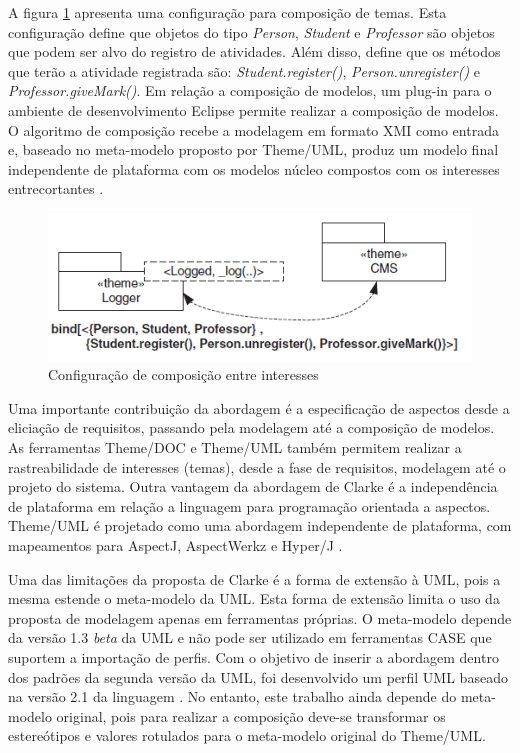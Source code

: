 A figura \ref{fig:theme_3} apresenta uma configuração para composição de temas. Esta configuração define que objetos do tipo \textit{Person},
\textit{Student} e \textit{Professor} são objetos que podem ser alvo do registro de atividades. Além disso, define que os métodos que terão a
atividade registrada são: \textit{Student.register()}, \textit{Person.unregister()} e \textit{Professor.giveMark()}. Em relação a composição de
modelos, um plug-in para o ambiente de desenvolvimento Eclipse \cite{Eclipse} permite realizar a composição de modelos. O algoritmo de composição
recebe a modelagem em formato XMI como entrada e, baseado no meta-modelo proposto por Theme/UML, produz um modelo final independente de plataforma com
os modelos núcleo compostos com os interesses entrecortantes \cite{Carton:2009:MT:1692821.1692829}. 

\begin{figure}
	\centering
	\includegraphics[scale=0.8]{img/theme_3.png}
	\caption{Configuração de composição entre interesses}\label{fig:theme_3}
\end{figure}

Uma importante contribuição da abordagem é a especificação de aspectos desde a eliciação de requisitos, passando pela modelagem até a composição de
modelos. As ferramentas Theme/DOC e Theme/UML também permitem realizar a rastreabilidade de interesses (temas), desde a fase de requisitos, modelagem 
até o projeto do sistema. Outra vantagem da abordagem de Clarke é a independência de plataforma em relação a linguagem para programação orientada a
aspectos. Theme/UML é projetado como uma abordagem independente de plataforma, com mapeamentos para AspectJ, AspectWerkz \cite{aspectwerkz} e Hyper/J
\cite{hyperj}.

Uma das limitações da proposta de Clarke é a forma de extensão à UML, pois a mesma estende o meta-modelo da UML. Esta forma de extensão limita o uso
da proposta de modelagem apenas em ferramentas próprias. O meta-modelo depende da versão 1.3 \textit{beta} da UML e não pode ser utilizado em
ferramentas CASE que suportem a importação de perfis. Com o objetivo de inserir a abordagem dentro dos padrões da segunda versão da UML, foi
desenvolvido um perfil UML baseado na versão 2.1 da linguagem \cite{Carton:2009:MT:1692821.1692829}. No entanto, este trabalho ainda depende do meta-modelo 
original, pois para realizar a composição deve-se transformar os estereótipos e valores rotulados para o meta-modelo original do Theme/UML. 

